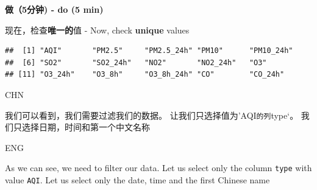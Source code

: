 \documentclass[]{book}
\newenvironment{Shaded}{\begin{snugshade}}{\end{snugshade}}
\newcommand{\DecValTok}[1]{\textcolor[rgb]{0.00,0.00,0.81}{#1}}
\newcommand{\KeywordTok}[1]{\textcolor[rgb]{0.13,0.29,0.53}{\textbf{#1}}}
\newcommand{\NormalTok}[1]{#1}
\newcommand{\OperatorTok}[1]{\textcolor[rgb]{0.81,0.36,0.00}{\textbf{#1}}}
\newcommand{\StringTok}[1]{\textcolor[rgb]{0.31,0.60,0.02}{#1}}
\begin{document}
\textbf{做（5分钟) - do (5 min)}

\begin{Shaded}
\end{Shaded}

现在，检查\textbf{唯一的}值 - Now, check \textbf{unique} values

\begin{Shaded}
\end{Shaded}

\begin{verbatim}
##  [1] "AQI"       "PM2.5"     "PM2.5_24h" "PM10"      "PM10_24h" 
##  [6] "SO2"       "SO2_24h"   "NO2"       "NO2_24h"   "O3"       
## [11] "O3_24h"    "O3_8h"     "O3_8h_24h" "CO"        "CO_24h"
\end{verbatim}

CHN

我们可以看到，我们需要过滤我们的数据。 让我们只选择值为'AQI\texttt{的列}type`。
我们只选择日期，时间和第一个中文名称

ENG

As we can see, we need to filter our data. Let us select only the column \texttt{type} with value \texttt{AQI}.
Let us select only the date, time and the first Chinese name

\begin{Shaded}
\end{Shaded}
\end{document}
